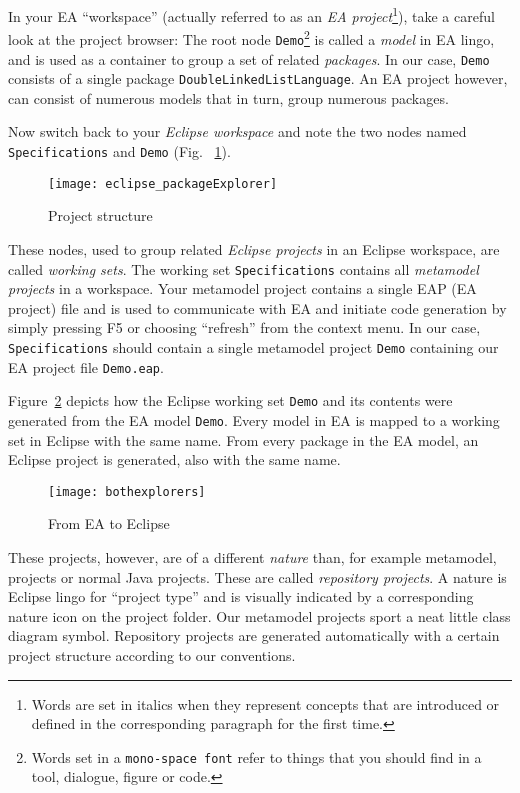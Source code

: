 In your EA ``workspace'' (actually referred to as an \emph{EA project}\footnote{Words are set in italics when they represent concepts that are introduced or
defined  in the corresponding paragraph for the first time.}), take a careful  look at the project browser:  The root node \texttt{Demo}\footnote{Words set  in
a \texttt{mono-space font} refer to things that you should find in a tool,  dialogue, figure or code.} is called a \emph{model} in EA lingo, and is used as a
container to group a set of related \emph{packages}. In our case, \texttt{Demo}  consists of a single package \texttt{DoubleLinkedListLanguage}. An EA project
however, can consist of numerous models that in turn, group numerous packages.

Now switch back to your \emph{Eclipse workspace} and note the two nodes named \texttt{Spe\-ci\-fi\-ca\-tions} and \texttt{Demo} (Fig. ~\ref{fig_eclipsePS}).

\begin{figure}[htbp]
    \centering
    \texttt{[image: eclipse\_packageExplorer]}
    \caption{Project structure}
    \label{fig_eclipsePS}
 \end{figure}

These nodes, used to group related \emph{Eclipse projects} in an Eclipse workspace, are called \emph{working sets}. The working set
\texttt{Spe\-ci\-fi\-ca\-tions} contains all \emph{metamodel projects} in a  workspace. Your metamodel project contains a single EAP (EA project) file and is
used to communicate with EA and initiate code generation by simply pressing F5 or choosing ``refresh'' from the context menu.
In our case, \texttt{Specifications} should contain a single metamodel project \texttt{Demo} containing our EA project file  \texttt{Demo.eap}.
 
Figure~\ref{fig_fromEAtoEclipse} depicts how the Eclipse working set \texttt{Demo} and its contents were generated from the EA model \texttt{Demo}. Every model
in EA is mapped to a working set in Eclipse with the same name. From every package in the EA model, an Eclipse project is generated, also with the same name.

\begin{figure}[htbp]
    \centering
  \texttt{[image: bothexplorers]}
    \caption{From EA to Eclipse}
    \label{fig_fromEAtoEclipse}
\end{figure}

These projects, however, are of a different \emph{nature} than, for example metamodel, projects or normal Java projects. These are called \emph{repository
projects}. A nature is Eclipse lingo for ``project type'' and is visually indicated by a corresponding nature icon on the project folder.
Our metamodel projects sport a neat little class diagram symbol. Repository projects are generated automatically with a certain project structure according to
our conventions.

